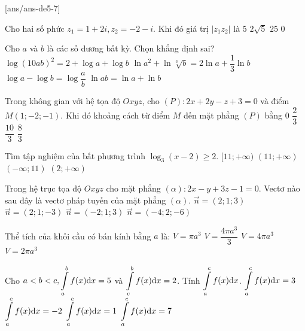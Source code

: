 
\begin{name}
	{\tenchude}
	{\tendethi}
	{\tentruong}
	{\thoigian}
\end{name}
[ans/ans-de5-7]

\begin{ex}%
Cho hai số phức $z_1=1+2 i, z_2=-2-i$. Khi đó giá trị $\left|z_1 z_2\right|$ là
\choice
{\True $5$}
{$2\sqrt{5}$}
{$25$}
{$0$}

\end{ex}
\begin{ex}%
Cho $a$ và $b$ là các số dương bất kỳ. Chọn khẳng định sai?
\choice
{\True $\log (10 a b)^2=2+\log a+\log b$}
{$\ln a^2+\ln \sqrt[3]{b}=2\ln a+\dfrac{1}{3} \ln b$}
{$\log a-\log b=\log \dfrac{a}{b}$}
{$\ln a b=\ln a+\ln b$}

\end{ex}
\begin{ex}%
Trong không gian với hệ tọa độ $O x y z$, cho $(P)\colon 2 x+2 y-z+3=0$ và điểm $M(1;-2;-1)$. Khi đó khoảng cách từ điểm $M$ đến mặt phẳng $(P)$ bằng
\choice
{$0$}
{\True $\dfrac{2}{3}$}
{$\dfrac{10}{3}$}
{$\dfrac{8}{3}$}

\end{ex}
\begin{ex}%
Tìm tập nghiệm của bất phương trình $\log_3(x-2) \geq 2$.
\choice
{\True $[11;+\infty)$}
{$(11;+\infty)$}
{$(-\infty; 11)$}
{$(2;+\infty)$}

\end{ex}
\begin{ex}%
Trong hệ trục tọa độ ${O} x y z$ cho mặt phẳng $(\alpha)\colon 2 x-y+3 z-1=0$.
Vectơ nào sau đây là vectơ pháp tuyến của mặt phẳng $(\alpha)$.
\choice
{$\vec{n}=(2; 1; 3)$}
{$\vec{n}=(2; 1;-3)$}
{$\vec{n}=(-2; 1; 3)$}
{\True $\vec{n}=(-4; 2;-6)$}

\end{ex}
\begin{ex}%
Thể tích của khối cầu có bán kính bằng $a$ là:
\choice
{$V=\pi a^3$}
{\True $V=\dfrac{4\pi a^3}{3}$}
{$V=4\pi a^3$}
{$V=2\pi a^3$}

\end{ex}
\begin{ex}%
Cho $a<b<c, \displaystyle\displaystyle\int\limits_a^{b} f(x) \mathrm{d} x=5$ và $\displaystyle\displaystyle\int\limits_c^{b} f(x) \mathrm{d} x=2$. Tính $\displaystyle\displaystyle\int\limits_a^{c} f(x) \mathrm{d} x$.
\choice
{\True $\displaystyle\displaystyle\int\limits_a^{c} f(x) \mathrm{d} x=3$}
{$\displaystyle\displaystyle\int\limits_a^{c} f(x) \mathrm{d} x=-2$}
{$\displaystyle\displaystyle\int\limits_a^{c} f(x) \mathrm{d} x=1$}
{$\displaystyle\displaystyle\int\limits_a^{c} f(x) \mathrm{d} x=7$}

\end{ex}
